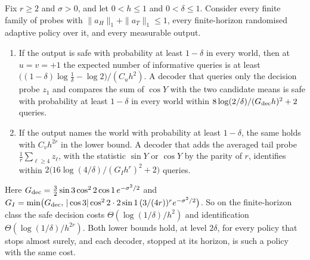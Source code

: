
\begin{theorem}
\label{thm:famrates}
Fix $r\ge2$ and $\sigma>0$, and let $0<h\le1$ and $0<\delta\le1$. Consider every finite family of
probes with $\|a_{H}\|_{1}+\|a_{T}\|_{1}\le1$, every finite-horizon randomised adaptive policy
over it, and every measurable output.
\begin{enumerate}
\item[(i)] If the output is safe with probability at least $1-\delta$ in every world, then at
$u=v=+1$ the expected number of informative queries is at least
$\bigl((1-\delta)\log\frac1\delta-\log2\bigr)/(C_{u}h^{2})$. A decoder that queries only the
decision probe $z_{1}$ and compares the sum of $\cos Y$ with the two candidate means is safe
with probability at least $1-\delta$ in every world within
$8\log(2/\delta)/(G_{\rm dec}h)^{2}+2$ queries.
\item[(ii)] If the output names the world with probability at least $1-\delta$, the same holds
with $C_{v}h^{2r}$ in the lower bound. A decoder that adds the averaged tail probe
$\frac1r\sum_{\ell\ge4}z_{\ell}$, with the statistic $\sin Y$ or $\cos Y$ by the parity of $r$,
identifies within $2\bigl(16\log(4/\delta)/(G_{I}h^{r})^{2}+2\bigr)$ queries.
\end{enumerate}
Here $G_{\rm dec}=\frac32\sin3\cos^{2}2\cos1\,e^{-\sigma^{2}/2}$ and
$G_{I}=\min\bigl(G_{\rm dec},\,|\cos3|\cos^{2}2\cdot2\sin1\,(3/(4r))^{r}e^{-\sigma^{2}/2}\bigr)$.
So on the finite-horizon class the safe decision costs $\Theta(\log(1/\delta)/h^{2})$ and
identification $\Theta(\log(1/\delta)/h^{2r})$. Both lower bounds hold, at level $2\delta$, for
every policy that stops almost surely, and each decoder, stopped at its horizon, is such a
policy with the same cost.
\end{theorem}


